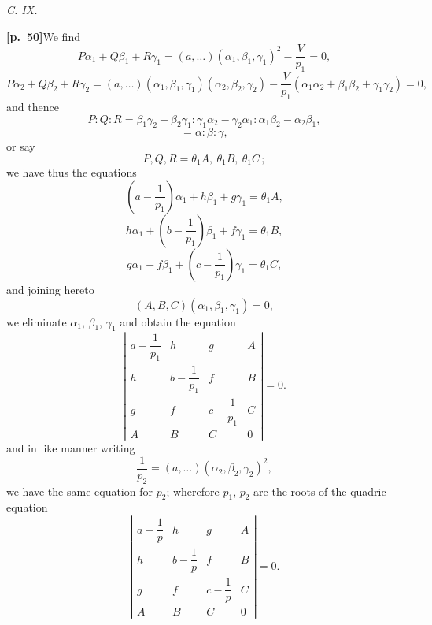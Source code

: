 \documentclass[11pt,a4paper]{article}
\begin{document}
\bigskip

\begin{center}\textit{C. IX.}\end{center}

\bigskip

\noindent\textbf{[p.~50]}\quad We find
\[
P\alpha_{1} + Q\beta_{1} + R\gamma_{1} = (a, \ldots)(\alpha_{1}, \beta_{1}, \gamma_{1})^{2} - \frac{V}{p_{1}} = 0,
\]
\[
P\alpha_{2} + Q\beta_{2} + R\gamma_{2} = (a, \ldots)(\alpha_{1}, \beta_{1}, \gamma_{1})(\alpha_{2}, \beta_{2}, \gamma_{2}) - \frac{V}{p_{1}}(\alpha_{1}\alpha_{2} + \beta_{1}\beta_{2} + \gamma_{1}\gamma_{2}) = 0,
\]
and thence
\[
P : Q : R = \beta_{1}\gamma_{2} - \beta_{2}\gamma_{1} : \gamma_{1}\alpha_{2} - \gamma_{2}\alpha_{1} : \alpha_{1}\beta_{2} - \alpha_{2}\beta_{1},
\]
\[
= \alpha : \beta : \gamma,
\]
or say
\[
P, Q, R = \theta_{1}A,\ \theta_{1}B,\ \theta_{1}C\,;
\]
we have thus the equations
\[
\left(a - \frac{1}{p_{1}}\right)\alpha_{1} + h\beta_{1} + g\gamma_{1} = \theta_{1}A,
\]
\[
h\alpha_{1} + \left(b - \frac{1}{p_{1}}\right)\beta_{1} + f\gamma_{1} = \theta_{1}B,
\]
\[
g\alpha_{1} + f\beta_{1} + \left(c - \frac{1}{p_{1}}\right)\gamma_{1} = \theta_{1}C,
\]
and joining hereto
\[
(A, B, C)(\alpha_{1}, \beta_{1}, \gamma_{1}) = 0,
\]
we eliminate $\alpha_{1}$, $\beta_{1}$, $\gamma_{1}$ and obtain the equation
\[
\left|\begin{array}{cccc}
a - \dfrac{1}{p_{1}} & h & g & A \\[0.3em]
h & b - \dfrac{1}{p_{1}} & f & B \\[0.3em]
g & f & c - \dfrac{1}{p_{1}} & C \\[0.3em]
A & B & C & 0
\end{array}\right| = 0.
\]
and in like manner writing
\[
\frac{1}{p_{2}} = (a, \ldots)(\alpha_{2}, \beta_{2}, \gamma_{2})^{2},
\]
we have the same equation for $p_{2}$; wherefore $p_{1}$, $p_{2}$ are the roots of the quadric equation
\[
\left|\begin{array}{cccc}
a - \dfrac{1}{p} & h & g & A \\[0.3em]
h & b - \dfrac{1}{p} & f & B \\[0.3em]
g & f & c - \dfrac{1}{p} & C \\[0.3em]
A & B & C & 0
\end{array}\right| = 0.
\]

\bigskip
\end{document}

